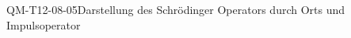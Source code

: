
\begin{REM}{QM-T12-08-05}{Darstellung des Schrödinger Operators durch Orts und Impulsoperator}
\end{REM}
